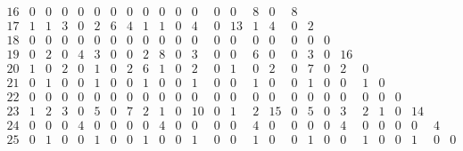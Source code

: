 \documentclass[12pt,a4paper]{article}
\begin{document}
\begin{landscape}
\[\begin{array}{c|ccccccccccccccccccccccccc}
	16&  0&  0&  0&  0&  0&  0&  0&  0&  0&  0&  0&  0&  0&  8&  0&  8&   &   &   &   &   &   &   &   &   \\
	17&  1&  1&  3&  0&  2&  6&  4&  1&  1&  0&  4&  0& 13&  1&  4&  0&  2&   &   &   &   &   &   &   &   \\
	18&  0&  0&  0&  0&  0&  0&  0&  0&  0&  0&  0&  0&  0&  0&  0&  0&  0&  0&   &   &   &   &   &   &   \\
	19&  0&  2&  0&  4&  3&  0&  0&  2&  8&  0&  3&  0&  0&  6&  0&  0&  3&  0& 16&   &   &   &   &   &   \\
	20&  1&  0&  2&  0&  1&  0&  2&  6&  1&  0&  2&  0&  1&  0&  2&  0&  7&  0&  2&  0&   &   &   &   &   \\
	21&  0&  1&  0&  0&  1&  0&  0&  1&  0&  0&  1&  0&  0&  1&  0&  0&  1&  0&  0&  1&  0&   &   &   &   \\
	22&  0&  0&  0&  0&  0&  0&  0&  0&  0&  0&  0&  0&  0&  0&  0&  0&  0&  0&  0&  0&  0&  0&   &   &   \\
	23&  1&  2&  3&  0&  5&  0&  7&  2&  1&  0& 10&  0&  1&  2& 15&  0&  5&  0&  3&  2&  1&  0& 14&   &   \\
	24&  0&  0&  0&  4&  0&  0&  0&  0&  4&  0&  0&  0&  0&  4&  0&  0&  0&  0&  4&  0&  0&  0&  0&  4&   \\
	25&  0&  1&  0&  0&  1&  0&  0&  1&  0&  0&  1&  0&  0&  1&  0&  0&  1&  0&  0&  1&  0&  0&  1&  0&  0\\
	\end{array}
	\]
	\end{landscape}
\end{document}
